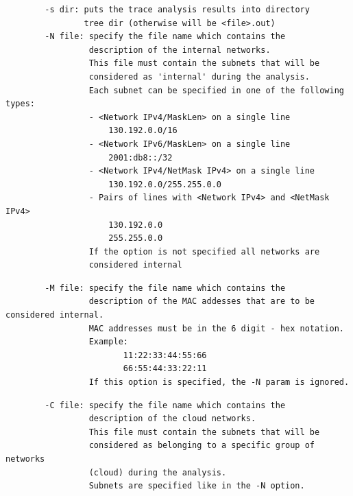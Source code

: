 \documentclass[11pt]{article}
\begin{document}
\begin{small}\begin{verbatim}
        -s dir: puts the trace analysis results into directory
                tree dir (otherwise will be <file>.out)
        -N file: specify the file name which contains the
                 description of the internal networks.
                 This file must contain the subnets that will be
                 considered as 'internal' during the analysis.
                 Each subnet can be specified in one of the following types:
                 - <Network IPv4/MaskLen> on a single line                  
                     130.192.0.0/16                                         
                 - <Network IPv6/MaskLen> on a single line                  
                     2001:db8::/32                                    
                 - <Network IPv4/NetMask IPv4> on a single line             
                     130.192.0.0/255.255.0.0                                
                 - Pairs of lines with <Network IPv4> and <NetMask IPv4>    
                     130.192.0.0                                            
                     255.255.0.0                                            
                 If the option is not specified all networks are
                 considered internal
\end{verbatim}\end{small} \noindent
\begin{small}\begin{verbatim}
        -M file: specify the file name which contains the
                 description of the MAC addesses that are to be considered internal.
                 MAC addresses must be in the 6 digit - hex notation.
                 Example:
                        11:22:33:44:55:66 
                        66:55:44:33:22:11 
                 If this option is specified, the -N param is ignored.
\end{verbatim}\end{small} \noindent
\begin{small}\begin{verbatim}
        -C file: specify the file name which contains the
                 description of the cloud networks.
                 This file must contain the subnets that will be
                 considered as belonging to a specific group of networks
                 (cloud) during the analysis.
                 Subnets are specified like in the -N option.
\end{verbatim}\end{small} \noindent
\end{document}
